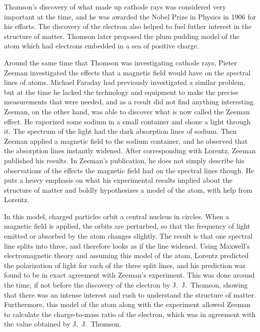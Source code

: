 \documentclass[12pt, oneside, letterpaper, fleqn]{article}
\begin{document}
Thomson's discovery of what made up cathode rays was considered very
important at the time, and he was awarded the Nobel Prize in Physics in
1906 for his efforts. The discovery of the electron also helped to fuel
futher interest in the structure of matter. Thomson later proposed the
plum pudding model of the atom which had electrons embedded in a sea of
positive charge.

Around the same time that Thomson was investigating cathode rays, Pieter
Zeeman investigated the effects that a magnetic field would have on the
spectral lines of atoms. Michael Faraday had previously investigated a
similar problem, but at the time he lacked the technology and equipment
to make the precise measurements that were needed, and as a result did
not find anything interesting.  Zeeman, on the other hand, was able to
discover what is now called the Zeeman effect. He vaporized some sodium
in a small container and shone a light through it. The spectrum of the
light had the dark absorption lines of sodium. Then Zeeman applied a
magnetic field to the sodium container, and he observed that the
absorption lines instantly widened.  After corresponding with Lorentz,
Zeeman published his results.  In Zeeman's publication, he does not
simply describe his observations of the effects the magnetic field had
on the spectral lines though. He puts a heavy emphasis on what his
experimental results implied about the structure of matter and boldly
hypothesizes a model of the atom, with help from Lorentz.

In this model, charged particles orbit a central nucleus in circles.
When a magnetic field is applied, the orbits are perturbed, so that the
frequency of light emitted or absorbed by the atom changes slightly. The
result is that one spectral line splits into three, and therefore looks
as if the line widened. Using Maxwell's electromagnetic theory and
assuming this model of the atom, Lorentz predicted the polarization of
light for each of the three split lines, and his prediction was found to
be in exact agreement with Zeeman's experiment. This was done around the
time, if not before the discovery of the electron by J.\ J.\ Thomson,
showing that there was an intense interest and rush to understand the
structure of matter. Furthermore, this model of the atom along with the
experiment allowed Zeeman to calculate the charge-to-mass ratio of the
electron, which was in agreement with the value obtained by J.\ J.\
Thomson.
\end{document}
